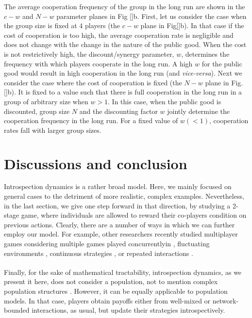 \documentclass[11pt]{article}
\theoremstyle{plainCl1}
\theoremstyle{plainCl2}
\begin{document}
\noindent The average cooperation frequency of the group in the long run are shown in the $c-w$ and $N-w$ parameter planes in Fig \ref{}b. First, let us consider the case when the group size is fixed at 4 players (the $c-w$ plane in Fig\ref{}b). In that case if the cost of cooperation is too high, the average cooperation rate is negligible and does not change with the change in the nature of the public good. When the cost is not restrictively high, the discount/synergy parameter, $w$, determines the frequency with which players cooperate in the long run. A high $w$ for the public good would result in high cooperation in the long run (and \emph{vice-versa}). Next we consider the case where the cost of cooperation is fixed (the $N-w$ plane in Fig. \ref{}b). It is fixed to a value such that there is full cooperation in the long run in a group of arbitrary size when $w > 1$. In this case, when the public good is discounted, group size $N$ and the discounting factor $w$ jointly determine the cooperation frequency in the long run. For a fixed value of $w (< 1)$, cooperation rates fall with larger group sizes. 

\section*{Discussions and conclusion}



Introspection dynamics is a rather broad model. Here, we mainly focused on general cases to the detriment of more realistic, complex examples. Nevertheless, in the last section, we give one step forward in that direction, by studying a 2-stage game, where individuals are allowed to reward their co-players condition on previous actions. Clearly, there are a number of ways in which we can further employ our model. For example, other researchers recently studied multiplayer games considering multiple games played concurrentlyin \cite{Venkateswaran:PRSB:2019}, fluctuating environments \cite{Baron:JRSOP:2018}, continuous strategies \cite{Molina:JMB:2017}, or repeated interactions \cite{Hilbe:JTB:2015}. \\ \\ 
\noindent
Finally, for the sake of mathematical tractability, introspection dynamics, as we present it here, does not consider a population, not to mention complex population structures \cite{Broom:JTB:2012, Wu:Games:2013, Pena:JTB:2015, Pena:JRSI:2016, Pattni:JTB:2017, Su:PNAS:2022}. However, it can be equally applicable to population models. In that case, players obtain payoffs either from well-mixed or network-bounded interactions, as usual, but update their strategies introspectively.
\end{document}
